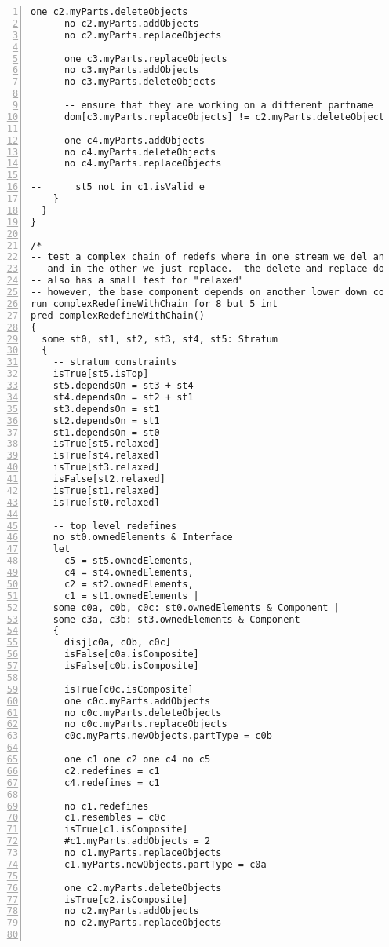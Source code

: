 \begin{lstlisting}[caption={unittests\_redefinition.als}, numbers=left]
      one c2.myParts.deleteObjects
      no c2.myParts.addObjects
      no c2.myParts.replaceObjects
      
      one c3.myParts.replaceObjects
      no c3.myParts.addObjects
      no c3.myParts.deleteObjects
      
      -- ensure that they are working on a different partname
      dom[c3.myParts.replaceObjects] != c2.myParts.deleteObjects
      
      one c4.myParts.addObjects
      no c4.myParts.deleteObjects
      no c4.myParts.replaceObjects
      
--      st5 not in c1.isValid_e
    }
  }
}

/*
-- test a complex chain of redefs where in one stream we del and then add on top of that
-- and in the other we just replace.  the delete and replace don't work on the same partname
-- also has a small test for "relaxed"
-- however, the base component depends on another lower down component which is also redefined...
run complexRedefineWithChain for 8 but 5 int
pred complexRedefineWithChain()
{
  some st0, st1, st2, st3, st4, st5: Stratum
  {
    -- stratum constraints
    isTrue[st5.isTop]
    st5.dependsOn = st3 + st4
    st4.dependsOn = st2 + st1
    st3.dependsOn = st1
    st2.dependsOn = st1
    st1.dependsOn = st0
    isTrue[st5.relaxed]
    isTrue[st4.relaxed]
    isTrue[st3.relaxed]
    isFalse[st2.relaxed]
    isTrue[st1.relaxed]
    isTrue[st0.relaxed]

    -- top level redefines
    no st0.ownedElements & Interface
    let
      c5 = st5.ownedElements,
      c4 = st4.ownedElements,
      c2 = st2.ownedElements,
      c1 = st1.ownedElements |
    some c0a, c0b, c0c: st0.ownedElements & Component |
    some c3a, c3b: st3.ownedElements & Component
    {
      disj[c0a, c0b, c0c]
      isFalse[c0a.isComposite]
      isFalse[c0b.isComposite]

      isTrue[c0c.isComposite]
      one c0c.myParts.addObjects
      no c0c.myParts.deleteObjects
      no c0c.myParts.replaceObjects
      c0c.myParts.newObjects.partType = c0b
      
      one c1 one c2 one c4 no c5
      c2.redefines = c1
      c4.redefines = c1

      no c1.redefines
      c1.resembles = c0c
      isTrue[c1.isComposite]
      #c1.myParts.addObjects = 2
      no c1.myParts.replaceObjects
      c1.myParts.newObjects.partType = c0a
      
      one c2.myParts.deleteObjects
      isTrue[c2.isComposite]
      no c2.myParts.addObjects
      no c2.myParts.replaceObjects
      

\end{lstlisting}
